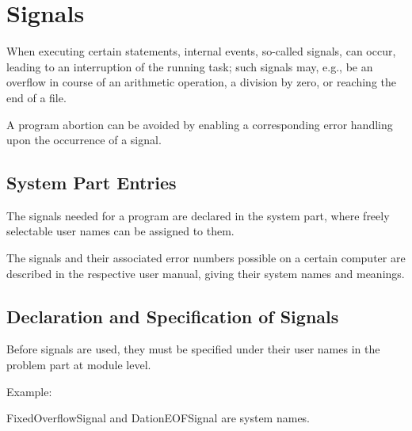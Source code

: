 \chapter{Signals}   %
\label{signals}

When executing certain statements, internal events, so-called signals,
can occur, leading to an interruption of the running task; such signals
may, e.g., be an overflow in course of an arithmetic operation, a
division by zero, or reaching the end of a file.

A program abortion can be avoided by enabling a corresponding error
handling upon the occurrence of a signal.

\section{System Part Entries}
The signals needed for a program are declared in the system part, where
freely selectable user names can be assigned to them.




The signals and their associated error numbers possible on a certain
computer are described in the respective user manual, giving their
system names and meanings.

\section{Declaration and Specification of Signals} 

Before signals are used, they must be specified under their user names
in the problem part at module level.

Example:

FixedOverflowSignal and DationEOFSignal are system names.

